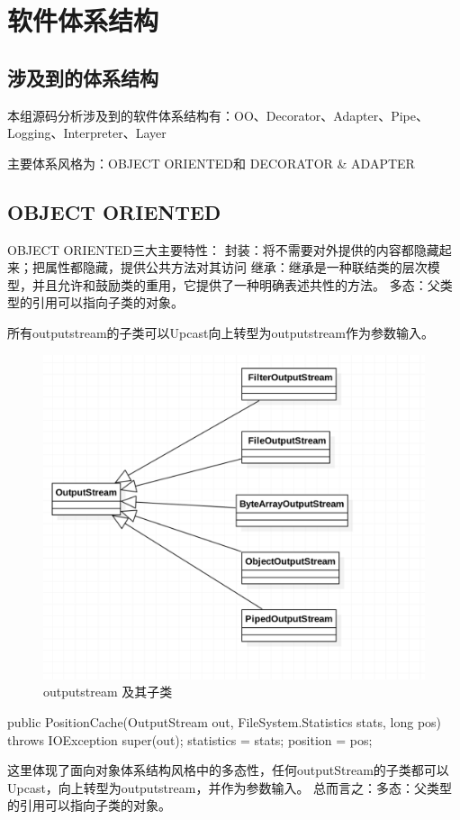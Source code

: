 \section{软件体系结构}
\label{sec:sa}
\subsection{涉及到的体系结构}
本组源码分析涉及到的软件体系结构有：OO、Decorator、Adapter、Pipe、Logging、Interpreter、Layer

主要体系风格为：OBJECT ORIENTED和 DECORATOR \& ADAPTER
\subsection{OBJECT ORIENTED}
OBJECT ORIENTED三大主要特性：
封装：将不需要对外提供的内容都隐藏起来；把属性都隐藏，提供公共方法对其访问
继承：继承是一种联结类的层次模型，并且允许和鼓励类的重用，它提供了一种明确表述共性的方法。
多态：父类型的引用可以指向子类的对象。

所有outputstream的子类可以Upcast向上转型为outputstream作为参数输入。
\begin{figure}[h]
\centering
\includegraphics[width =1\linewidth]{output.png}
\caption{outputstream 及其子类}
\label{fig:sa:OutputStream}
\end{figure}
\begin{java}
public PositionCache(OutputStream out,
                     FileSystem.Statistics stats,
                     long pos) throws IOException {
  super(out);
  statistics = stats;
  position = pos;
}
\end{java}
这里体现了面向对象体系结构风格中的多态性，任何outputStream的子类都可以Upcast，向上转型为outputstream，并作为参数输入。
总而言之：多态：父类型的引用可以指向子类的对象。

